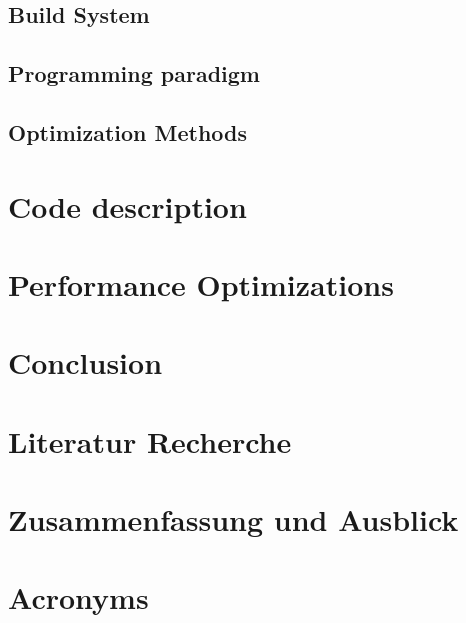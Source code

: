 \documentclass[12pt,oneside,bibtotoc,liststotoc]{scrbook}
\begin{document}
\section{Build System}

% 
\section{Programming paradigm}

% 
\section{Optimization Methods}

% 


\chapter{Code description}

% 



\chapter{Performance Optimizations}

% 






\chapter{Conclusion}




\chapter{Literatur Recherche}


\newpage
\chapter{Zusammenfassung und Ausblick}

\newpage

%
%


\chapter{Acronyms}

% 
\end{document}
